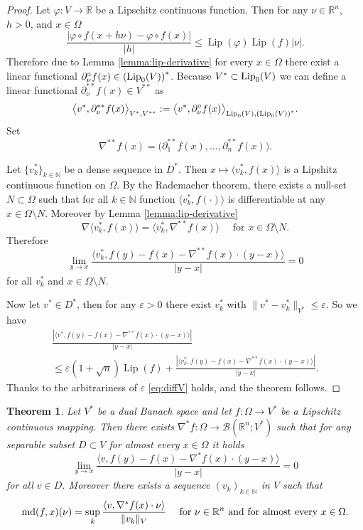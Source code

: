 \documentclass[reqno]{amsart}
\newtheorem{thm}{Theorem}[section]
\begin{document}
\begin{proof}
Let $\varphi: V\to \mathbb R$ be a Lipschitz continuous function. 
Then for any $\nu\in\mathbb R^n$, $h>0$, and $x\in\Omega$
\[
\frac{|\varphi\circ f(x+h\nu) - \varphi\circ f(x)|}{|h|} \leq \operatorname{Lip}(\varphi)\operatorname{Lip}(f)|\nu|.
\]
Therefore due to Lemma \ref{lemma:lip-derivative} for every $x\in\Omega$ 
there exist a linear functional $\partial^\circ_\nu f(x)\in\left(\textnormal{Lip}_{0}(V)\right)^*$.
Because $V^*\subset \textnormal{Lip}_{0}(V)$ we can define a linear functional $\partial^{**}_{\nu}f(x)\in V^{**}$
as
\[
\big\langle v^*, \partial^{**}_\nu f(x)\big\rangle_{V^*,V^{**}} 
:= \big\langle v^*, \partial^\circ_\nu f(x) \big\rangle_{\textnormal{Lip}_{0}(V), \left(\textnormal{Lip}_{0}(V)\right)^*}.
\]
Set 
\[
\nabla^{**}f(x) = \big(\partial^{**}_{1}f(x), \dots, \partial^{**}_{n}f(x) \big).
\]

Let $\{v^*_k\}_{k\in \mathbb N}$ be a dense sequence in $D^*$.
Then $x\mapsto \langle v^*_k, f(x)\rangle$ is a Lipshitz continuous function on $\Omega$.
By the Rademacher theorem, there exists a null-set $N\subset\Omega$ 
such that for all $k\in\mathbb N$ function $\langle v^*_k, f(\cdot)\rangle$ is differentiable at any $x\in\Omega\setminus N$.
Moreover by Lemma \ref{lemma:lip-derivative} 
\[
\nabla \langle v^*_k, f(x)\rangle = \langle v^*_k, \nabla^{**}f(x)\rangle \quad \text{ for } x\in\Omega\setminus N.
\]
Therefore
\[
\lim_{y\to x} \frac{\langle v^*_k, f(y) - f(x) - \nabla^{**}f(x)\cdot(y-x)\rangle}{|y-x|} = 0
\]
for all  $v^*_k$ and $x\in\Omega\setminus N$.

Now let $v^*\in D^*$, then for any $\varepsilon>0$ there exist $v^*_k$ with $\|v^* -v^*_k \|_{V^*}\leq \varepsilon$.
So we have
\begin{multline*}
\frac{|\langle v^*, f(y) - f(x) - \nabla^{**}f(x)\cdot(y-x)\rangle|}{|y-x|}\\
\leq \varepsilon(1+\sqrt{n})\operatorname{Lip}(f) 
+ \frac{|\langle v^*_k, f(y) - f(x) - \nabla^{**}f(x)\cdot(y-x)\rangle|}{|y-x|}.
\end{multline*}
Thanks to the arbitrariness of $\varepsilon$ \eqref{eq:diffV} holds, and the theorem follows.
\end{proof}

\begin{thm} 
Let $V^*$ be a dual Banach space and let $f:\Omega\to V^*$ be a Lipschitz continuous mapping.
Then there exists $\nabla^{*}f :\Omega \to \mathcal B(\mathbb R^n; V^{*})$
such that for any separable subset $D\subset V$ for almost every $x\in\Omega$
it holds 
\begin{equation}
\lim_{y\to x} \frac{\langle v, f(y) - f(x) - \nabla^{*}f(x)\cdot(y-x)\rangle}{|y-x|} = 0
\end{equation}
for all $v\in D$. 
Moreover there exists a sequence $(v_k)_{k\in\mathbb N}$ in $V$ such that
\[
\textnormal{md}(f, x)(\nu) = \sup_k\frac{\langle v, \nabla^{*}f(x)\cdot\nu\rangle}{\|v_k\|_{V}}  \quad \text{ for } \nu\in\mathbb R^n \textnormal{ and for almost every } x\in\Omega.
\] 
\end{thm}
\end{document}
